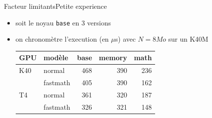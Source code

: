 \documentclass[11pt,mathserif]{beamer}
\begin{document}
\begin{frame}{Facteur limitants}{Petite experience}
  \begin{itemize}[<+->]
    \item soit le noyau \texttt{base} en 3 versions
      
    \item on chronomètre l'execution (en $\mu$s) avec $N=8Mo$ sur un K40M
    \begin{minipage}[l]{0.49\linewidth}
      \begin{center}
        \begin{tabular}{|l |l|r|r|r|}
          \hline
          GPU & modèle    & base    & memory & math  \\ 
          \hline
          K40 &normal    &  468    &  390   &  236\\ 
              &fastmath  &  405    &  390   &  162 \\ 
          \hline
          T4 & normal    &  361    &  320   &  187\\ 
             & fastmath  &  326    &  321   &  148 \\ 
          \hline
        \end{tabular}
      \end{center}
    \end{minipage}
  \end{itemize}
\end{frame}
\end{document}

